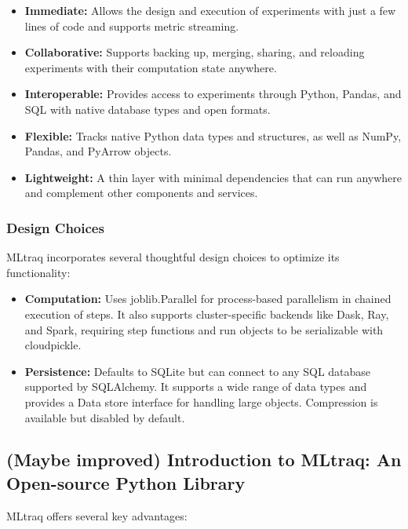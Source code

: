 \begin{itemize}
    \item \textbf{Immediate:} Allows the design and execution of experiments with just a few lines of code and supports metric streaming.
    \item \textbf{Collaborative:} Supports backing up, merging, sharing, and reloading experiments with their computation state anywhere.
    \item \textbf{Interoperable:} Provides access to experiments through Python, Pandas, and SQL with native database types and open formats.
    \item \textbf{Flexible:} Tracks native Python data types and structures, as well as NumPy, Pandas, and PyArrow objects.
    \item \textbf{Lightweight:} A thin layer with minimal dependencies that can run anywhere and complement other components and services.
\end{itemize}

\subsubsection{Design Choices}

MLtraq incorporates several thoughtful design choices to optimize its functionality:

\begin{itemize}
    \item \textbf{Computation:} Uses joblib.Parallel for process-based parallelism in chained execution of steps. It also supports cluster-specific backends like Dask, Ray, and Spark, requiring step functions and run objects to be serializable with cloudpickle.
    \item \textbf{Persistence:} Defaults to SQLite but can connect to any SQL database supported by SQLAlchemy. It supports a wide range of data types and provides a Data store interface for handling large objects. Compression is available but disabled by default.
\end{itemize}
\newpage


\subsection{(Maybe improved) Introduction to MLtraq: An Open-source Python Library}


MLtraq offers several key advantages:

